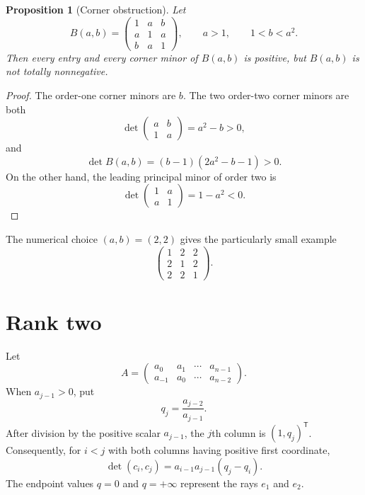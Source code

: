 \documentclass{amsart}
\numberwithin{equation}{section}
\newtheorem{proposition}[theorem]{Proposition}
\theoremstyle{definition}
\theoremstyle{remark}
\newcommand{\transpose}{\mathsf T}
\begin{document}
\begin{proposition}[Corner obstruction]\label{prop:corner}
Let
\[
 B(a,b)=
 \begin{pmatrix}
 1&a&b\\
 a&1&a\\
 b&a&1
 \end{pmatrix},
 \qquad a>1,\qquad 1<b<a^2.
\]
Then every entry and every corner minor of $B(a,b)$ is positive, but $B(a,b)$ is not totally nonnegative.
\end{proposition}

\begin{proof}
The order-one corner minors are $b$.  The two order-two corner minors are both
\[
 \det\begin{pmatrix}a&b\\1&a\end{pmatrix}=a^2-b>0,
\]
and
\[
 \det B(a,b)=(b-1)(2a^2-b-1)>0.
\]
On the other hand, the leading principal minor of order two is
\[
 \det\begin{pmatrix}1&a\\a&1\end{pmatrix}=1-a^2<0.
\]
\end{proof}

The numerical choice $(a,b)=(2,2)$ gives the particularly small example
\[
 \begin{pmatrix}1&2&2\\2&1&2\\2&2&1\end{pmatrix}.
\]

\section{Rank two}

Let
\begin{equation}\label{eq:rank2A}
 A=
 \begin{pmatrix}
 a_0&a_1&\cdots&a_{n-1}\\
 a_{-1}&a_0&\cdots&a_{n-2}
 \end{pmatrix}.
\end{equation}
When $a_{j-1}>0$, put
\begin{equation}\label{eq:qrank2}
 q_j=\frac{a_{j-2}}{a_{j-1}}.
\end{equation}
After division by the positive scalar $a_{j-1}$, the $j$th column is $(1,q_j)^{\transpose}$.  Consequently, for $i<j$ with both columns having positive first coordinate,
\begin{equation}\label{eq:rank2minor}
 \det(c_i,c_j)=a_{i-1}a_{j-1}(q_j-q_i).
\end{equation}
The endpoint values $q=0$ and $q=+\infty$ represent the rays $e_1$ and $e_2$.
\end{document}
